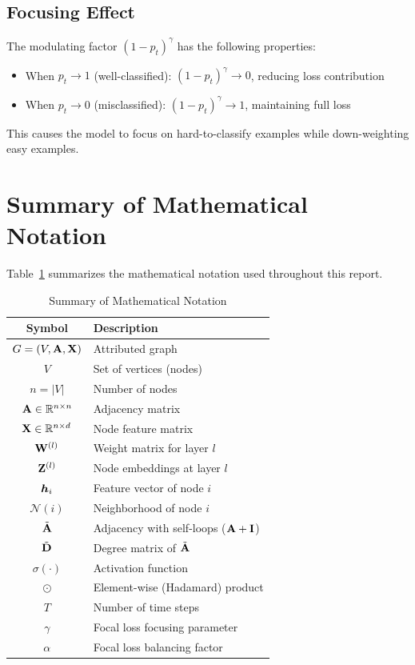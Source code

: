 \subsection{Focusing Effect}

The modulating factor $(1 - p_t)^\gamma$ has the following properties:
\begin{itemize}
    \item When $p_t \to 1$ (well-classified): $(1 - p_t)^\gamma \to 0$, reducing loss contribution
    \item When $p_t \to 0$ (misclassified): $(1 - p_t)^\gamma \to 1$, maintaining full loss
\end{itemize}

This causes the model to focus on hard-to-classify examples while down-weighting easy examples.

\section{Summary of Mathematical Notation}

Table~\ref{tab:notation} summarizes the mathematical notation used throughout this report.

\begin{table}[H]
\centering
\caption{Summary of Mathematical Notation}
\label{tab:notation}
\begin{tabular}{cl}
\toprule
\textbf{Symbol} & \textbf{Description} \\
\midrule
$G = (V, \mathbf{A}, \mathbf{X})$ & Attributed graph \\
$V$ & Set of vertices (nodes) \\
$n = |V|$ & Number of nodes \\
$\mathbf{A} \in \mathbb{R}^{n \times n}$ & Adjacency matrix \\
$\mathbf{X} \in \mathbb{R}^{n \times d}$ & Node feature matrix \\
$\mathbf{W}^{(l)}$ & Weight matrix for layer $l$ \\
$\mathbf{Z}^{(l)}$ & Node embeddings at layer $l$ \\
$\bm{h}_i$ & Feature vector of node $i$ \\
$\mathcal{N}(i)$ & Neighborhood of node $i$ \\
$\tilde{\mathbf{A}}$ & Adjacency with self-loops ($\mathbf{A} + \mathbf{I}$) \\
$\tilde{\mathbf{D}}$ & Degree matrix of $\tilde{\mathbf{A}}$ \\
$\sigma(\cdot)$ & Activation function \\
$\odot$ & Element-wise (Hadamard) product \\
$T$ & Number of time steps \\
$\gamma$ & Focal loss focusing parameter \\
$\alpha$ & Focal loss balancing factor \\
\bottomrule
\end{tabular}
\end{table}




